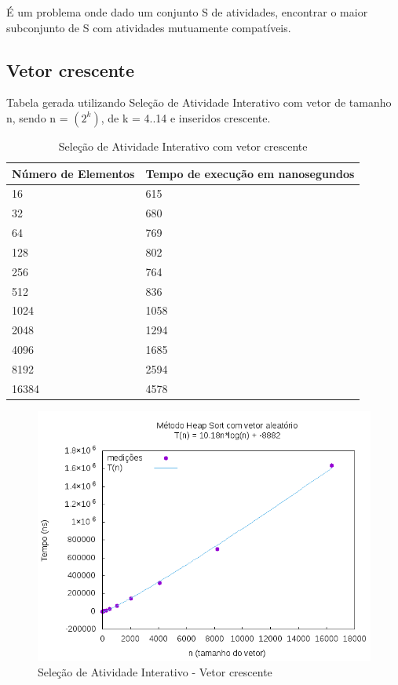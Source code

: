 \documentclass[12pt,a4paper,twoside]{report}
\begin{document}
É um problema onde dado um conjunto S de atividades, encontrar o maior subconjunto de S com
atividades mutuamente compatíveis.

\subsection{Vetor crescente}
Tabela gerada utilizando Seleção de Atividade Interativo com vetor de tamanho n, sendo n = $(2^k)$, de k = 4..14 e inseridos crescente.
\begin{table}[H]
\centering
\caption{Seleção de Atividade Interativo com vetor crescente}
\label{my-label}
\begin{tabular}{|l|l|}
\hline
\multicolumn{1}{|c|}{\textbf{Número de Elementos}} & \multicolumn{1}{c|}{\textbf{Tempo de execução em nanosegundos}} \\ \hline
16 & 615 \\ \hline
32 & 680 \\ \hline
64 & 769 \\ \hline
128 & 802 \\ \hline
256 & 764 \\ \hline
512 & 836 \\ \hline
1024 & 1058 \\ \hline
2048 & 1294 \\ \hline
4096 & 1685 \\ \hline
8192 & 2594 \\ \hline
16384 & 4578 \\ \hline

\end{tabular}
\end{table}

\begin{figure}[H]
    \centering
    \includegraphics[width=0.7\linewidth]{graficos/HeapSort/vIntAleatorio/vIntAleatorio.png}
  \caption{Seleção de Atividade Interativo - Vetor crescente}
\end{figure}
\end{document}
